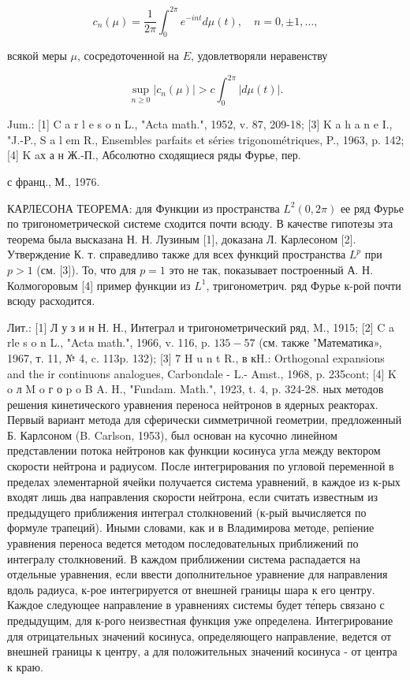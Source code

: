 \documentclass[10pt]{article}
\begin{document}
\[

c_{n}(\mu)=\frac{1}{2 \pi} \int_{0}^{2 \pi} e^{-i n t} d \mu(t), \quad n=0, \pm 1, \ldots,

\]



всякой меры $\mu$, сосредоточенной на $E$, удовлетворяли неравенству



\[

\sup _{n \geqslant 0}\left|c_{n}(\mu)\right|>c \int_{0}^{2 \pi}|d \mu(t)| .

\]



Jum.: [1] C a r l e s o n L., "Acta math.", 1952, v. 87, 209-18; [3] K a h a n e I., "J.-P., S a l em R., Ensembles parfaits et séries trigonométriques, P., 1963, p. 142; [4] K aх а н Ж.-П., Абсолютно сходящиеся ряды Фурье, пер.

с франц., М., 1976.



КАРЛЕСОНА ТЕОРЕМА: для Функции из пространства $L^{2}(0,2 \pi)$ ее ряд Фурье по тригонометрической системе сходится почти всюду. В качестве гипотезы эта теорема была высказана Н. Н. Лузиным [1], доказана Л. Карлесоном [2]. Утверждение К. т. справедливо также для всех функций пространства $L^{p}$ при $p>1$ (см. [3]). То, что для $p=1$ это не так, показывает построенный А. Н. Колмогоровым [4] пример функции из $L^{1}$, тригонометрич. ряд Фурье к-рой почти всюду расходится.



Лит.: [1] Л у з и н Н. Н., Интеграл и тригонометрический ряд, M., 1915; [2] C a rle s o n L., "Acta math.", 1966, v. 116, p. $135-57$ (см. также "Математика», 1967, т. 11, № 4, c. 113p. 132); [3] 7 H u n t R., в кH.: Orthogonal expansions and the ir continuons analogues, Carbondale - L.- Amst., 1968, p. 235cont; [4] K o л M o г о p o B A. H., "Fundam. Math.", 1923, t. 4, p. 324-28. ных методов решения кинетического уравнения переноса нейтронов в ядерных реакторах. Первый вариант метода для сферически симметричной геометрии, предложенный Б. Карлсоном (B. Carlson, 1953), был основан на кусочно линейном представлении потока нейтронов как функции косинуса угла между вектором скорости нейтрона и радиусом. После интегрирования по угловой переменной в пределах элементарной ячейки получается система уравнений, в каждое из к-рых входят лишь два направления скорости нейтрона, если считать известным из предыдущего приближения интеграл столкновений (к-рый вычисляется по формуле трапеций). Иными словами, как и в Владимирова методе, репіение уравнения переноса ведется методом последовательных приближений по интегралу столкновений. В каждом приближении система распадается на отдельные уравнения, если ввести дополнительное уравнение для направления вдоль радиуса, к-рое интегрируется от внешней границы шара к его центру. Каждое следующее направление в уравнениях системы будет те́перь связано с предыдущим, для к-рого неизвестная функция уже определена. Интегрирование для отрицательных значений косинуса, определяющего направление, ведется от внешней границы к центру, а для положительных значений косинуса - от центра к краю.
\end{document}
